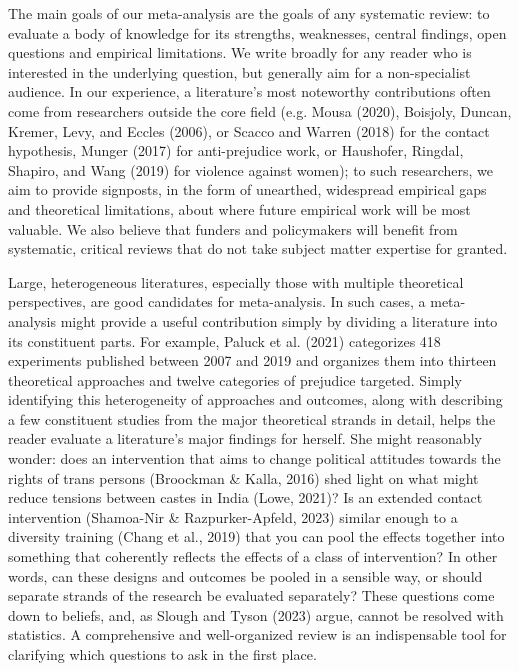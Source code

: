 \documentclass[
  ,jou]{apa6}
\begin{document}
The main goals of our meta-analysis are the goals of any systematic review: to evaluate a body of knowledge for its strengths, weaknesses, central findings, open questions and empirical limitations. We write broadly for any reader who is interested in the underlying question, but generally aim for a non-specialist audience. In our experience, a literature's most noteworthy contributions often come from researchers outside the core field (e.g. Mousa (2020), Boisjoly, Duncan, Kremer, Levy, and Eccles (2006), or Scacco and Warren (2018) for the contact hypothesis, Munger (2017) for anti-prejudice work, or Haushofer, Ringdal, Shapiro, and Wang (2019) for violence against women); to such researchers, we aim to provide signposts, in the form of unearthed, widespread empirical gaps and theoretical limitations, about where future empirical work will be most valuable. We also believe that funders and policymakers will benefit from systematic, critical reviews that do not take subject matter expertise for granted.

Large, heterogeneous literatures, especially those with multiple theoretical perspectives, are good candidates for meta-analysis. In such cases, a meta-analysis might provide a useful contribution simply by dividing a literature into its constituent parts. For example, Paluck et al. (2021) categorizes 418 experiments published between 2007 and 2019 and organizes them into thirteen theoretical approaches and twelve categories of prejudice targeted. Simply identifying this heterogeneity of approaches and outcomes, along with describing a few constituent studies from the major theoretical strands in detail, helps the reader evaluate a literature's major findings for herself. She might reasonably wonder: does an intervention that aims to change political attitudes towards the rights of trans persons (Broockman \& Kalla, 2016) shed light on what might reduce tensions between castes in India (Lowe, 2021)? Is an extended contact intervention (Shamoa-Nir \& Razpurker-Apfeld, 2023) similar enough to a diversity training (Chang et al., 2019) that you can pool the effects together into something that coherently reflects the effects of a class of intervention? In other words, can these designs and outcomes be pooled in a sensible way, or should separate strands of the research be evaluated separately? These questions come down to beliefs, and, as Slough and Tyson (2023) argue, cannot be resolved with statistics. A comprehensive and well-organized review is an indispensable tool for clarifying which questions to ask in the first place.
\end{document}
